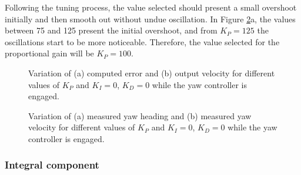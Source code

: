 Following the tuning process, the value selected should present a small overshoot initially and then smooth out without undue oscillation. In Figure \ref{fig:tune-yaw-prop-measures}a, the values between 75 and 125 present the initial overshoot, and from $K_P=125$ the oscillations start to be more noticeable. Therefore, the value selected for the proportional gain will be $K_P=100$. 


\begin{figure}[H]
    \begin{minipage}[t]{0.5\linewidth}
        \centering
        \scalebox{0.55}{}
    \end{minipage}
    \begin{minipage}[t]{0.5\linewidth}
        \centering
        \scalebox{0.55}{}
    \end{minipage}
    \caption{Variation of (a) computed error and (b) output velocity for different values of $K_{P}$ and $K_I=0$, $K_D=0$ while the yaw controller is engaged.}
    \label{fig:tune-yaw-prop-io}
\end{figure}
\begin{figure}[H]
    \begin{minipage}[t]{0.5\linewidth}
        \centering
        \scalebox{0.55}{}
    \end{minipage}
    \begin{minipage}[t]{0.5\linewidth}
        \centering
        \scalebox{0.55}{}
    \end{minipage}
    \caption{Variation of (a) measured yaw heading and (b) measured yaw velocity for different values of $K_{P}$ and $K_I=0$, $K_D=0$ while the yaw controller is engaged.}
    \label{fig:tune-yaw-prop-measures}
\end{figure}


\subsubsection{Integral component}

